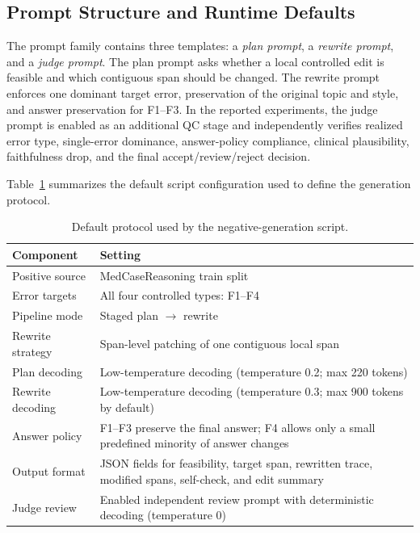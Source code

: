 \documentclass[a4paper,fleqn,doubleblind]{cas-sc}
\begin{document}
\subsection{Prompt Structure and Runtime Defaults}

The prompt family contains three templates: a \textit{plan prompt}, a \textit{rewrite prompt}, and a \textit{judge prompt}. The plan prompt asks whether a local controlled edit is feasible and which contiguous span should be changed. The rewrite prompt enforces one dominant target error, preservation of the original topic and style, and answer preservation for F1--F3. In the reported experiments, the judge prompt is enabled as an additional QC stage and independently verifies realized error type, single-error dominance, answer-policy compliance, clinical plausibility, faithfulness drop, and the final accept/review/reject decision.

Table~\ref{tab:negative_protocol_defaults} summarizes the default script configuration used to define the generation protocol.

\begin{table}[htbp]
    \centering
    \caption{Default protocol used by the negative-generation script.}
    \label{tab:negative_protocol_defaults}
    \begin{tabular}{lp{}}
        \toprule
        \textbf{Component} & \textbf{Setting} \\
        \midrule
        Positive source & MedCaseReasoning train split \\
        Error targets & All four controlled types: F1--F4 \\
        Pipeline mode & Staged plan $\rightarrow$ rewrite \\
        Rewrite strategy & Span-level patching of one contiguous local span \\
        Plan decoding & Low-temperature decoding (temperature 0.2; max 220 tokens) \\
        Rewrite decoding & Low-temperature decoding (temperature 0.3; max 900 tokens by default) \\
        Answer policy & F1--F3 preserve the final answer; F4 allows only a small predefined minority of answer changes \\
        Output format & JSON fields for feasibility, target span, rewritten trace, modified spans, self-check, and edit summary \\
        Judge review & Enabled independent review prompt with deterministic decoding (temperature 0) \\
        \bottomrule
    \end{tabular}
\end{table}
\end{document}
